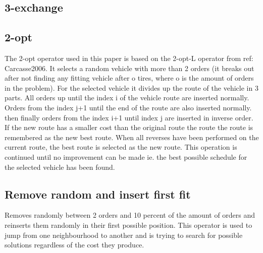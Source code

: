 \documentclass[../main.tex]{subfiles}
\begin{document}
\subsection{3-exchange}
\label{ssec:exch}


\subsection{2-opt}
\label{ssec:2opt}
The 2-opt operator used in this paper is based on the 2-opt-L operator from {ref: Carcasse2006}. 
It selects a random vehicle with more than 2 orders (it breaks out after not finding any fitting vehicle after o tires, where o is the amount of orders in the problem).
For the selected vehicle it divides up the route of the vehicle in 3 parts. 
All orders up until the index i of the vehicle route are inserted normally. 
Orders from the index j+1 until the end of the route are also inserted normally. 
then finally orders from the index i+1 until index j are inserted in inverse order.
If the new route has a smaller cost than the original route the route the route is remembered as the new best route. 
When all reverses have been performed on the current route, the best route is selected as the new route.
This operation is continued until no improvement can be made ie. the best possible schedule for the selected vehicle has been found.

\subsection{Remove random and insert first fit}
\label{ssec:rand}
Removes randomly between 2 orders and 10 percent of the amount of orders and reinserts them randomly in their first possible position. 
This operator is used to jump from one neighbourhood to another and is trying to search for possible solutions regardless of the cost they produce.
\end{document}
